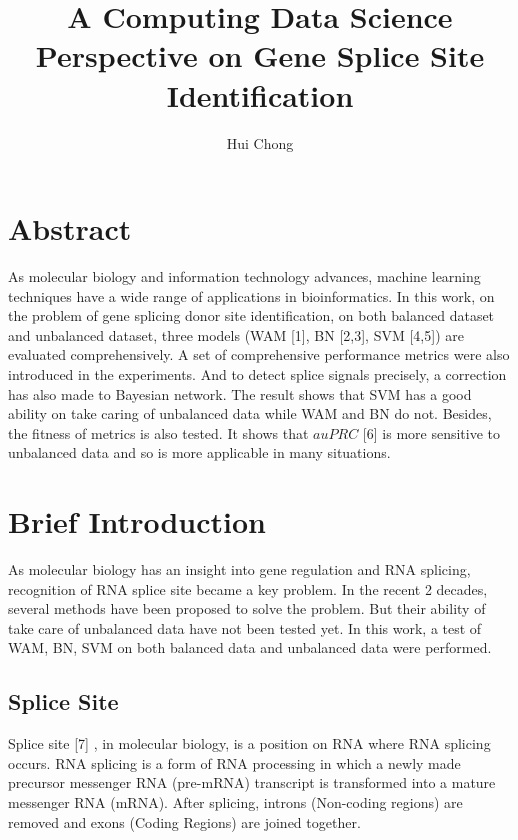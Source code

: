 \documentclass[11pt]{article}
\title{A Computing Data Science Perspective on Gene Splice Site Identification}
\author{Hui Chong}
\begin{document}
    
    \maketitle
    
    


    \hypertarget{abstract}{%
\section{Abstract}\label{abstract}}

As molecular biology and information technology advances, machine
learning techniques have a wide range of applications in bioinformatics.
In this work, on the problem of gene splicing donor site identification,
on both balanced dataset and unbalanced dataset, three models (WAM
{[}1{]}, BN {[}2,3{]}, SVM {[}4,5{]}) are evaluated comprehensively. A
set of comprehensive performance metrics were also introduced in the
experiments. And to detect splice signals precisely, a correction has
also made to Bayesian network. The result shows that SVM has a good
ability on take caring of unbalanced data while WAM and BN do not.
Besides, the fitness of metrics is also tested. It shows that \(auPRC\)
{[}6{]} is more sensitive to unbalanced data and so is more applicable
in many situations.

    \hypertarget{brief-introduction}{%
\section{Brief Introduction}\label{brief-introduction}}

As molecular biology has an insight into gene regulation and RNA
splicing, recognition of RNA splice site became a key problem. In the
recent 2 decades, several methods have been proposed to solve the
problem. But their ability of take care of unbalanced data have not been
tested yet. In this work, a test of WAM, BN, SVM on both balanced data
and unbalanced data were performed.

    \hypertarget{splice-site}{%
\subsection{Splice Site}\label{splice-site}}

Splice site {[}7{]} , in molecular biology, is a position on RNA where
RNA splicing occurs. RNA splicing is a form of RNA processing in which a
newly made precursor messenger RNA (pre-mRNA) transcript is transformed
into a mature messenger RNA (mRNA). After splicing, introns (Non-coding
regions) are removed and exons (Coding Regions) are joined together.
\end{document}
